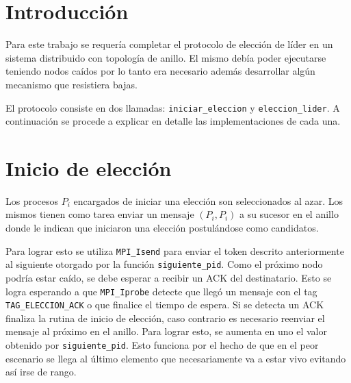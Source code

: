 \documentclass[a4paper]{article}
\begin{document}

\maketitle
\thispagestyle{empty}

\newpage
\tableofcontents

\newpage
\section{Introducción}

Para este trabajo se requería completar el protocolo de elección de líder en un
sistema distribuido con topología de anillo. El mismo debía poder ejecutarse
teniendo nodos caídos por lo tanto era necesario además desarrollar algún
mecanismo que resistiera bajas.

El protocolo consiste en dos llamadas: \texttt{iniciar\_eleccion} y
\texttt{eleccion\_lider}. A continuación se procede a explicar en detalle las
implementaciones de cada una.

\section{Inicio de elección}

Los procesos $P_i$ encargados de iniciar una elección son seleccionados al azar. Los
mismos tienen como tarea enviar un mensaje $(P_i, P_i)$ a su sucesor en el
anillo donde le indican que iniciaron una elección postulándose como
candidatos.

Para lograr esto se utiliza \texttt{MPI\_Isend} para enviar el token descrito
anteriormente al siguiente otorgado por la función \texttt{siguiente\_pid}.
Como el próximo nodo podría estar caído, se debe esperar a recibir un
\textsc{ACK} del destinatario. Esto se logra esperando a que
\texttt{MPI\_Iprobe} detecte que llegó un mensaje con el tag
\texttt{TAG\_ELECCION\_ACK} o que finalice el tiempo de espera. Si se detecta un
\textsc{ACK} finaliza la rutina de inicio de elección, caso contrario es
necesario reenviar el mensaje al próximo en el anillo. Para lograr esto, se
aumenta en uno el valor obtenido por \texttt{siguiente\_pid}. Esto funciona por
el hecho de que en el peor escenario se llega al último elemento que
necesariamente va a estar vivo evitando así irse de rango.
\end{document}
